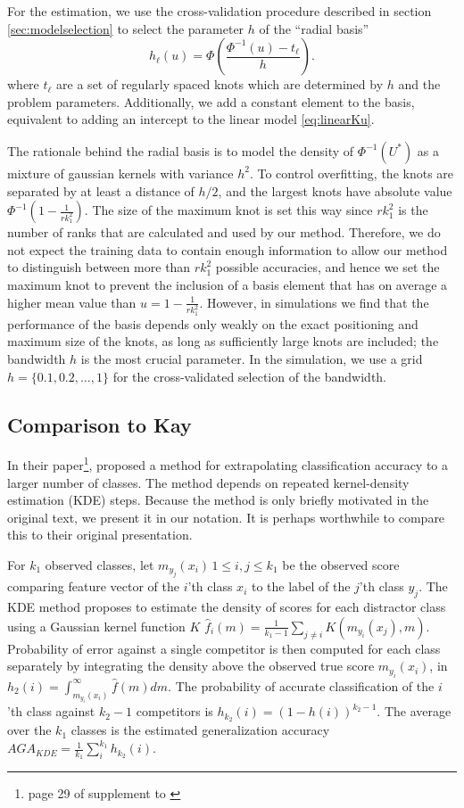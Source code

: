 \documentclass[twoside,11pt]{article}
\begin{document}
For the estimation, we use the cross-validation procedure described
in section \ref{sec:modelselection} to select the parameter $h$ of the
``radial basis''
\[
h_\ell(u) = \Phi\left(\frac{\Phi^{-1}(u) - t_\ell}{h}\right).
\]
where $t_\ell$ are a set of regularly spaced knots which are
determined by $h$ and the problem parameters. Additionally, we add a
constant element to the basis, equivalent to adding an intercept to
the linear model \eqref{eq:linearKu}. 

The rationale behind the radial basis is to model the density of
$\Phi^{-1}(U^*)$ as a mixture of gaussian kernels with variance $h^2$.
To control overfitting, the knots are separated by at least a distance
of $h/2$, and the largest knots have absolute value $\Phi^{-1}(1 -
\frac{1}{rk_1^2}).$ The size of the maximum knot is set this way since
$rk_1^2$ is the number of ranks that are calculated and used by our
method.  Therefore, we do not expect the training data to contain
enough information to allow our method to distinguish between more
than $rk_1^2$ possible accuracies, and hence we set the maximum knot
to prevent the inclusion of a basis element that has on average a
higher mean value than $u = 1-\frac{1}{rk_1^2}$.  However, in
simulations we find that the performance of the basis depends only
weakly on the exact positioning and maximum size of the knots, as long
as sufficiently large knots are included; the bandwidth $h$ is the
most crucial parameter.  In the simulation, we use a grid $h = \{0.1,
0.2, \hdots, 1\}$ for the cross-validated selection of the bandwidth.



\subsection*{Comparison to Kay}
\label{sec:KDEcomparison}
In their paper\footnote{page 29 of supplement to \cite{Kay2008a}},
\cite{Kay2008a} proposed a method for extrapolating classification
accuracy to a larger number of classes. The method depends on repeated
kernel-density estimation (KDE) steps. Because the method is only
briefly motivated in the original text, we present it in our
notation. It is perhaps worthwhile to compare this to their original
presentation.

For $k_1$ observed classes, let $m_{y_j}(x_i)\, 1\leq i,j\leq k_1$ be
the observed score comparing feature vector of the $i$'th class $x_i$
to the label of the $j$'th class $y_j$. The KDE method proposes to
estimate the density of scores for each distractor class using a
Gaussian kernel function $K$ $\hat{f}_i(m) = \frac{1}{k_1-1}
\sum_{j\neq i} K(m_{y_i}(x_j), m)$. Probability of error against a
single competitor is then computed for each class separately by
integrating the density above the observed true score $m_{y_i}(x_i)$,
in $h_2(i) = \int_{m_{y_i}(x_i)}^\infty \hat{f}(m)dm$. The probability
of accurate classification of the $i$'th class against $k_2-1$
competitors is $h_{k_2}(i) = (1-h(i))^{k_2-1}$. The average over the
$k_1$ classes is the estimated generalization accuracy
$\hat{AGA}_{KDE} = \frac{1}{k_1} \sum_{i}^{k_1} h_{k_2}(i)$.
\end{document}
